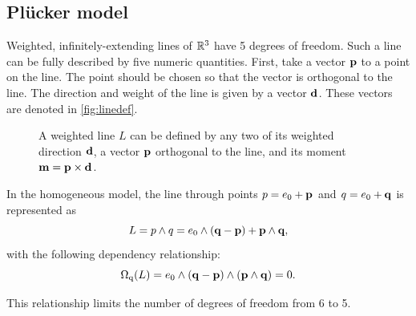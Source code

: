 \subsection{Pl\"ucker model}
\label{sec:hongbo}
\label{sec:plucker}


Weighted, infinitely-extending lines of $\mathbb{R}^3$ have 5 degrees of freedom.  Such a line can be fully described by five numeric quantities. First, take a vector $\mathbf{p}$ to a point on the line.  The point should be chosen so that the vector is orthogonal to the line.  The direction and weight of the line is given by a vector $\mathbf{d}$.  These vectors are denoted in \autoref{fig:linedef}.

\begin{figure}
  \caption{A weighted line $L$ can be defined by any two of its weighted direction $\mathbf{d}$, a vector $\mathbf{p}$ orthogonal to the line, and its moment $\mathbf{m} = \mathbf{p} \times \mathbf{d}$.}
  \label{fig:linedef}
  \begin{center}
  \end{center}
\end{figure}

In the homogeneous model, the line through points $p = e_0 + \mathbf{p}$ and $q = e_0 + \mathbf{q}$ is represented as 
\begin{equation*}
  L = p \wedge q = e_0 \wedge (\mathbf{q} - \mathbf{p}) + \mathbf{p} \wedge \mathbf{q} ,
\end{equation*}
with the following dependency relationship: 
\begin{equation} \label{eq:gaplucker0} 
  \operatorname{\Omega_q}(L) = e_0 \wedge (\mathbf{q} - \mathbf{p}) \wedge (\mathbf{p} \wedge \mathbf{q}) = 0 .
\end{equation}

This relationship limits the number of degrees of freedom from 6 to 5.

